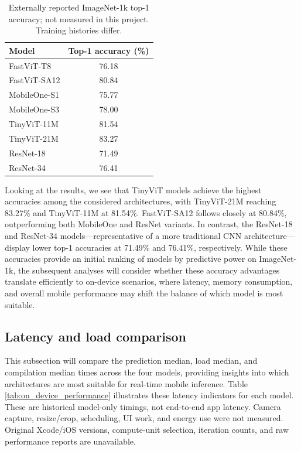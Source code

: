 \documentclass[12pt]{article}
\begin{document}
\begin{table}[tbp]
    \centering
    \doublespacing
    \captionsetup{justification=centering,margin=1cm}
    \begin{tabular}{l|c}
        \hline
        \textbf{Model} & \textbf{Top-1 accuracy (\%)} \\
        \hline
        FastViT-T8 & 76.18 \\
        FastViT-SA12 & 80.84 \\
        MobileOne-S1 & 75.77 \\
        MobileOne-S3 & 78.00 \\
        TinyViT-11M & 81.54 \\
        TinyViT-21M & 83.27 \\
        ResNet-18 & 71.49 \\
        ResNet-34 & 76.41 \\
        \hline
    \end{tabular}
    \caption{Externally reported ImageNet-1k top-1 accuracy; not measured in this project. Training histories differ.}
    \label{tab:imagenet_accuracy}
\end{table}

Looking at the results, we see that TinyViT models achieve the highest accuracies among the considered architectures, with TinyViT-21M reaching 83.27\% and TinyViT-11M at 81.54\%. FastViT-SA12 follows closely at 80.84\%, outperforming both MobileOne and ResNet variants. In contrast, the ResNet-18 and ResNet-34 models—representative of a more traditional CNN architecture—display lower top-1 accuracies at 71.49\% and 76.41\%, respectively. While these accuracies provide an initial ranking of models by predictive power on ImageNet-1k, the subsequent analyses will consider whether these accuracy advantages translate efficiently to on-device scenarios, where latency, memory consumption, and overall mobile performance may shift the balance of which model is most suitable.

\subsection{Latency and load comparison}
This subsection will compare the prediction median, load median, and compilation median times across the four models, providing insights into which architectures are most suitable for real-time mobile inference. Table \ref{tab:on_device_performance} illustrates these latency indicators for each model. These are historical model-only timings, not end-to-end app latency. Camera capture, resize/crop, scheduling, UI work, and energy use were not measured. Original Xcode/iOS versions, compute-unit selection, iteration counts, and raw performance reports are unavailable.
\end{document}
